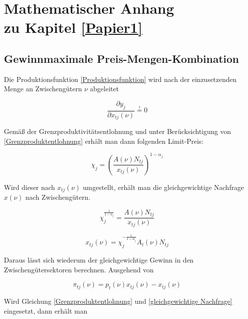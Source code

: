\chapter[Mathematischer Anhang zu Kapitel \ref{Papier1}]{Mathematischer Anhang \\ zu Kapitel \ref{Papier1}} 
\section[Gewinnmaximale Preis-Mengen-Kombination ]{Gewinnmaximale Preis-Mengen-Kombination }\label{sec:Appendix-Gewinn}



 Die Produktionsfunktion \eqref{Produktionsfunktion} wird nach der einzusetzenden Menge an Zwischengütern $\nu$ abgeleitet
 
 
\begin{equation}
\frac{\partial y_j}{\partial x_{tj}(\nu)}\overset{!}{=}0
\end{equation} 


Gemä{\ss} der Grenzproduktivitätsentlohnung  und  unter Berücksichtigung von \eqref{Grenzproduktentlohnung} erhält man dann folgenden Limit-Preis:


\begin{equation}
\boxed{\chi_j=\left(\frac{A(\nu)N_{tj}}{x_{tj}(\nu)}\right)^{1-\alpha_j}}\label{LimitPreis}
\end{equation}


Wird dieser nach $x_{tj}(\nu)$ umgestellt, erhält man die gleichgewichtige Nachfrage $x(\nu)$ nach Zwischengütern.


\begin{equation*}
\chi_j^{\frac{1}{1-\alpha_j}}=\frac{A(\nu)N_{tj}}{x_{tj}(\nu)}
\end{equation*}


\begin{equation}
x_{tj}(\nu)=\chi_j^{-\frac{1}{1-\alpha_j}}A_t(\nu)N_{tj}\label{gleichgewichtige Nachfrage}
\end{equation}


Daraus lässt sich wiederum der gleichgewichtige Gewinn in den Zwischengütersektoren berechnen. Ausgehend von


\begin{equation*}
\pi_{tj}(\nu)=p_t(\nu)x_{tj}(\nu)-x_{tj}(\nu)
\end{equation*}


Wird Gleichung \eqref{Grenzproduktentlohnung} und \eqref{gleichgewichtige Nachfrage} eingesetzt, dann erhält man


